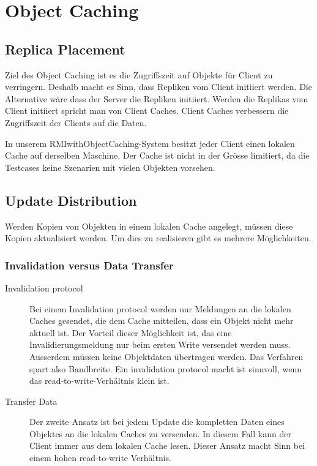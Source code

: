 \chapter{Object Caching}

\label{sec:object-caching}

\section{Replica Placement}
\label{sec:replica-management}

Ziel des Object Caching ist es die Zugriffszeit auf Objekte für Client zu verringern. Deshalb macht es Sinn, dass Repliken vom Client initiiert werden. Die Alternative wäre dass der Server die Repliken initiiert. Werden die Replikas vom Client initiiert spricht man von Client Caches. Client Caches verbessern die Zugriffszeit der Clients auf die Daten.

In unserem RMIwithObjectCaching-System besitzt jeder Client einen lokalen Cache auf derselben Maschine. Der Cache ist nicht in der Grösse limitiert, da die Testcases keine Szenarien mit vielen Objekten vorsehen.

\section{Update Distribution}
\label{sec:update-distribution}

Werden Kopien von Objekten in einem lokalen Cache angelegt, müssen diese Kopien aktualisiert werden. Um dies zu realisieren gibt es mehrere Möglich\-keiten.

\subsection{Invalidation versus Data Transfer}
\label{sec:inval-vers-data}

\begin{description}
\item[Invalidation protocol] Bei einem Invalidation protocol werden nur Meldungen an die lokalen Caches gesendet, die dem Cache mitteilen, dass ein Objekt nicht mehr aktuell ist. Der Vorteil dieser Möglichkeit ist, das eine Invalidierungsmeldung nur beim ersten Write versendet werden muss. Ausserdem müssen keine Objektdaten übertragen werden. Das Verfahren spart also Bandbreite. Ein invalidation protocol macht ist sinnvoll, wenn das read-to-write-Verhältnis klein ist.
\item[Transfer Data] Der zweite Ansatz ist bei jedem Update die kompletten Daten eines Objektes an die lokalen Caches zu versenden. In diesem Fall kann der Client immer aus dem lokalen Cache lesen. Dieser Ansatz macht Sinn bei einem hohen read-to-write Verhältnis.
\end{description}

